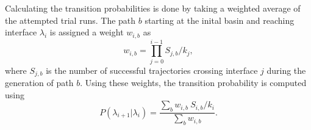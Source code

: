 Calculating the transition probabilities is done by taking a weighted average of the
attempted trial runs. The path $b$ starting at the inital basin and reaching
interface $\lambda_i$ is assigned a weight $w_{i,b}$ as
\begin{equation}
   w_{i,b} = \prod_{j=0}^{i-1} S_{j,b}/k_j,
\end{equation}
where $S_{j,b}$ is the number of successful trajectories crossing interface $j$ during
the generation of path $b$. Using these weights, the transition probability is computed
using
\begin{equation}
   P(\lambda_{i+1} | \lambda_i) = \frac{\sum_{b} w_{i,b}\ S_{i,b}/k_i}{\sum_b w_{i,b}}.
\end{equation}

